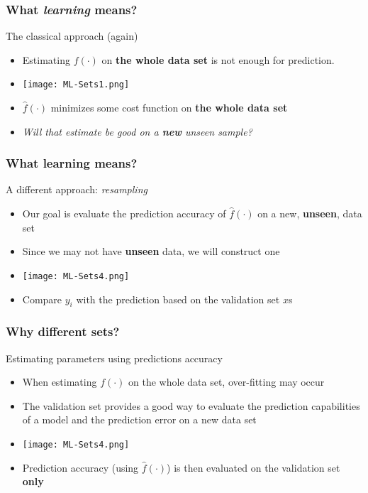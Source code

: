 \documentclass[xcolor=x11names,compress, aspectratio=169]{beamer}
\renewcommand{\(}{\begin{columns}}
\renewcommand{\)}{\end{columns}}
\newcommand{\<}[1]{\begin{column}{#1}}
\renewcommand{\>}{\end{column}}
\begin{document}
\begin{frame}
\frametitle{\textcolor{brique}{ What \emph{learning} means?}}
The classical approach (again)
\begin{itemize}
\item Estimating $f(\cdot)$ on \textbf{the whole data set} is not enough for prediction.
\item[] \texttt{[image: ML-Sets1.png]}
\item  $\widehat f(\cdot)$  minimizes some cost function on \textbf{the whole data set}
\item \emph{Will that estimate be good on a \textcolor[rgb]{1.00,0.00,0.00}{\textbf{new }} \emph{unseen} sample?}
\end{itemize}
\end{frame}


\begin{frame}
\frametitle{\textcolor{brique}{ What learning means?}}
A different approach: \textit{resampling}
\begin{itemize}[<+->]
\item Our goal is  evaluate the prediction accuracy of $\widehat f(\cdot)$ on a new, \textbf{unseen}, data set
\item Since we may not have \textbf{unseen} data, we will construct one
\item[] \texttt{[image: ML-Sets4.png]}
\item Compare $y_i$  with the prediction based on the validation set $x$s
\end{itemize}
\end{frame}



\begin{frame}
\frametitle{\textcolor{brique}{Why different sets? }}
Estimating parameters using predictions accuracy
\begin{itemize}[<+->]
\item When estimating $f(\cdot)$ on the whole data set, over-fitting may occur
\item The validation set provides a good way to evaluate the prediction capabilities of a model and the prediction error on a new data set
\item[] \texttt{[image: ML-Sets4.png]}
\item Prediction accuracy (using $\widehat f(\cdot)$) is then evaluated on the validation set \textbf{only}
\end{itemize}
\end{frame}
\end{document}
